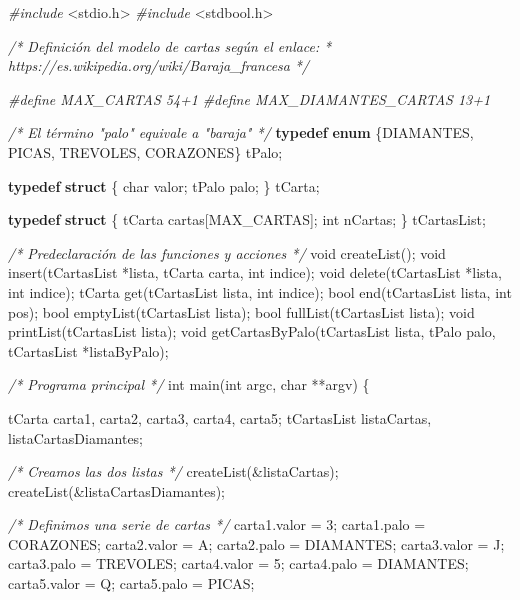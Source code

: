 \documentclass[
]{book}
\newenvironment{Shaded}{\begin{snugshade}}{\end{snugshade}}
\newcommand{\CharTok}[1]{\textcolor[rgb]{0.31,0.60,0.02}{#1}}
\newcommand{\CommentTok}[1]{\textcolor[rgb]{0.56,0.35,0.01}{\textit{#1}}}
\newcommand{\DataTypeTok}[1]{\textcolor[rgb]{0.13,0.29,0.53}{#1}}
\newcommand{\ImportTok}[1]{#1}
\newcommand{\KeywordTok}[1]{\textcolor[rgb]{0.13,0.29,0.53}{\textbf{#1}}}
\newcommand{\NormalTok}[1]{#1}
\newcommand{\PreprocessorTok}[1]{\textcolor[rgb]{0.56,0.35,0.01}{\textit{#1}}}
\begin{document}
\begin{Shaded}
\begin{Highlighting}[]
\PreprocessorTok{\#include }\ImportTok{\textless{}stdio.h\textgreater{}}
\PreprocessorTok{\#include }\ImportTok{\textless{}stdbool.h\textgreater{}}

\CommentTok{/* Definición del modelo de cartas según el enlace:}
\CommentTok{ *  https://es.wikipedia.org/wiki/Baraja\_francesa}
\CommentTok{ */}

\PreprocessorTok{\#define MAX\_CARTAS 54+1}
\PreprocessorTok{\#define MAX\_DIAMANTES\_CARTAS 13+1}

\CommentTok{/* El término "palo" equivale a "baraja" */}
\KeywordTok{typedef} \KeywordTok{enum}\NormalTok{ \{DIAMANTES, PICAS, TREVOLES, CORAZONES\} tPalo;}

\KeywordTok{typedef} \KeywordTok{struct}\NormalTok{ \{}
    \DataTypeTok{char}\NormalTok{ valor;}
\NormalTok{    tPalo palo;}
\NormalTok{\} tCarta;}

\KeywordTok{typedef} \KeywordTok{struct}\NormalTok{ \{}
\NormalTok{    tCarta cartas[MAX\_CARTAS];}
    \DataTypeTok{int}\NormalTok{ nCartas;}
\NormalTok{\} tCartasList;}

\CommentTok{/* Predeclaración de las funciones y acciones */}
\DataTypeTok{void}\NormalTok{ createList();}
\DataTypeTok{void}\NormalTok{ insert(tCartasList *lista, tCarta carta, }\DataTypeTok{int}\NormalTok{ indice);}
\DataTypeTok{void}\NormalTok{ delete(tCartasList *lista, }\DataTypeTok{int}\NormalTok{ indice);}
\NormalTok{tCarta get(tCartasList lista, }\DataTypeTok{int}\NormalTok{ indice);}
\DataTypeTok{bool}\NormalTok{ end(tCartasList lista, }\DataTypeTok{int}\NormalTok{ pos);}
\DataTypeTok{bool}\NormalTok{ emptyList(tCartasList lista);}
\DataTypeTok{bool}\NormalTok{ fullList(tCartasList lista);}
\DataTypeTok{void}\NormalTok{ printList(tCartasList lista);}
\DataTypeTok{void}\NormalTok{ getCartasByPalo(tCartasList lista, tPalo palo, tCartasList *listaByPalo);}

\CommentTok{/* Programa principal */}
\DataTypeTok{int}\NormalTok{ main(}\DataTypeTok{int}\NormalTok{ argc, }\DataTypeTok{char}\NormalTok{ **argv) \{}

\NormalTok{    tCarta carta1, carta2, carta3, carta4, carta5;}
\NormalTok{    tCartasList listaCartas, listaCartasDiamantes;}

    \CommentTok{/* Creamos las dos listas */}
\NormalTok{    createList(\&listaCartas);}
\NormalTok{    createList(\&listaCartasDiamantes);}

    \CommentTok{/* Definimos una serie de cartas */}
\NormalTok{    carta1.valor = }\CharTok{\textquotesingle{}3\textquotesingle{}}\NormalTok{;}
\NormalTok{    carta1.palo = CORAZONES;}
\NormalTok{    carta2.valor = }\CharTok{\textquotesingle{}A\textquotesingle{}}\NormalTok{;}
\NormalTok{    carta2.palo = DIAMANTES;}
\NormalTok{    carta3.valor = }\CharTok{\textquotesingle{}J\textquotesingle{}}\NormalTok{;}
\NormalTok{    carta3.palo = TREVOLES;}
\NormalTok{    carta4.valor = }\CharTok{\textquotesingle{}5\textquotesingle{}}\NormalTok{;}
\NormalTok{    carta4.palo = DIAMANTES;}
\NormalTok{    carta5.valor = }\CharTok{\textquotesingle{}Q\textquotesingle{}}\NormalTok{;}
\NormalTok{    carta5.palo = PICAS;}


\end{Highlighting}
\end{Shaded}
\end{document}
